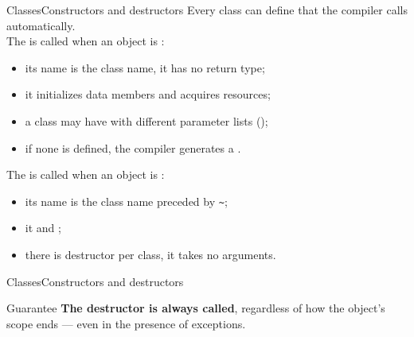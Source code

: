 \begin{frame}{Classes}{Constructors and destructors}
	\justifying
	Every class can define  that the compiler calls automatically.\\
	\bigskip
	The  is called when an object is :
	\begin{itemize}
		\item its name is the class name, it has no return type;
		\item it initializes data members and acquires resources;
		\item a class may have  with different parameter lists ();
		\item if none is defined, the compiler generates a .
	\end{itemize}
	\bigskip
	The  is called when an object is :
	\begin{itemize}
		\item its name is the class name preceded by \texttt{\textasciitilde};
		\item it  and ;
		\item there is  destructor per class, it takes no arguments.
	\end{itemize}
\end{frame}
\begin{frame}{Classes}{Constructors and destructors}
	\begin{alertblock}{Guarantee}
		\justifying
		\textbf{The destructor is always called}, regardless of how the object's scope ends — even in the presence of exceptions.
	\end{alertblock}
\end{frame}
